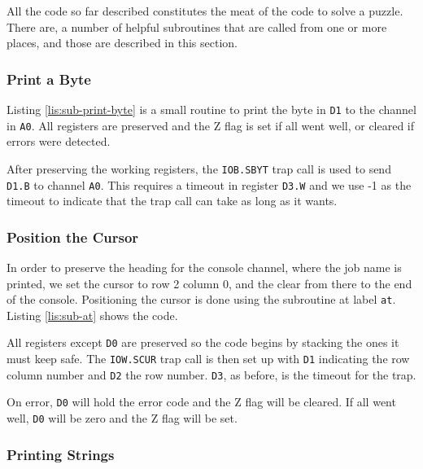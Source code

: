 All the code so far described constitutes the meat of the code to
solve a puzzle. There are, a number of helpful subroutines that are
called from one or more places, and those are described in this section.

\subsubsection{Print a Byte}

Listing \ref{lis:sub-print-byte} is a small routine to print the
byte in \texttt{D1} to the channel in \texttt{A0}. All registers are
preserved and the Z flag is set if all went well, or cleared if errors
were detected. 



After preserving the working registers, the \texttt{IOB.SBYT} trap
call is used to send \texttt{D1.B} to channel \texttt{A0}. This requires
a timeout in register \texttt{D3.W} and we use -1 as the timeout to
indicate that the trap call can take as long as it wants. 

\subsubsection{Position the Cursor}

In order to preserve the heading for the console channel, where the
job name is printed, we set the cursor to row 2 column 0, and the
clear from there to the end of the console. Positioning the cursor
is done using the subroutine at label \texttt{at}. Listing \ref{lis:sub-at}
shows the code.



All registers except \texttt{D0} are preserved so the code begins
by stacking the ones it must keep safe. The \texttt{IOW.SCUR} trap
call is then set up with \texttt{D1} indicating the row column number
and \texttt{D2} the row number. \texttt{D3}, as before, is the timeout
for the trap.

On error, \texttt{D0} will hold the error code and the Z flag will
be cleared. If all went well, \texttt{D0} will be zero and the Z flag
will be set.

\subsubsection{Printing Strings}

